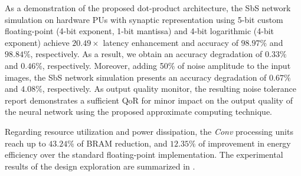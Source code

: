 As a demonstration of the proposed dot-product architecture, the SbS network simulation on hardware PUs with synaptic representation using 5-bit custom floating-point (4-bit exponent, 1-bit mantissa) and 4-bit logarithmic (4-bit exponent) achieve $20.49\times$ latency enhancement and accuracy of $98.97\%$ and $98.84\%$, respectively. As a result, we obtain an accuracy degradation of $0.33\%$ and $0.46\%$, respectively. Moreover, adding 50\% of noise amplitude to the input images, the SbS network simulation presents an accuracy degradation of $0.67\%$ and $4.08\%$, respectively. As output quality monitor, the resulting noise tolerance report demonstrates a sufficient QoR for minor impact on the output quality of the neural network using the proposed approximate computing technique.

Regarding resource utilization and power dissipation, the \emph{Conv} processing units reach up to $43.24\%$ of BRAM reduction, and $12.35\%$ of improvement in energy efficiency over the standard floating-point implementation. The experimental results of the design exploration are summarized in .


